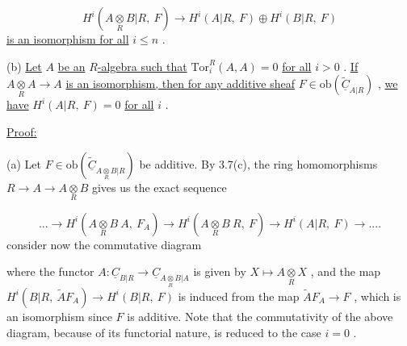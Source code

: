 \begin{equation*}
H^{i}(A\underset{R}{\otimes}B|R,\ F) \rightarrow H^{i}(A|R,\ F) \oplus H^{i}(B|R,\ F)
\end{equation*}
\underline{is an isomorphism for all}  $i \leq n$  .

(b)  \underline{Let}  $A$  \underline{be an} $R$\underline{-algebra such that}  $\mathrm{Tor}^{R}_{i}(A, A) = 0$  \underline{for all}  $i > 0$  . \underline{If}  $A\underset{R}{\otimes}A \rightarrow A$  \underline{is an isomorphism, then for any additive sheaf}  $F \in \mathrm{ob}(\widetilde{\underline{C}}_{A|R})$  , \underline{we have}  $H^{i}(A|R,\ F) = 0$  \underline{for all}  $i$  .


\underline{Proof:}

(a)  Let  $F \in \mathrm{ob}(\widetilde{\underline{C}}_{A\underset{R}{\otimes}B|R})$  be additive. By 3.7(c), the ring homomorphisms $R \rightarrow A \rightarrow A\underset{R}{\otimes}B$  gives us the exact sequence

\begin{equation}\tag{*}
... \rightarrow H^{i}(A\underset{R}{\otimes}B\ A,\ F_{A}) \rightarrow H^{i}(A\underset{R}{\otimes}B\ R,\ F) \rightarrow H^{i}(A|R,\ F) \rightarrow ....
\end{equation}
consider now the commutative diagram

\begin{center}
\end{center}
where the functor  $A : \underline{C}_{B|R} \rightarrow \underline{C}_{A\underset{R}{\otimes}B|A}$  is given by  $X \longmapsto A\underset{R}{\otimes}X$  , and the map $H^{i}(B|R,\ \widetilde{A}F_{A}) \rightarrow H^{i}(B|R,\ F)$  is induced from the map  $\widetilde{A}F_{A} \rightarrow F$  , which is an isomorphism since  $F$  is additive.  Note that the commutativity of the above diagram, because of its functorial nature, is reduced to the case  $i = 0$  .

